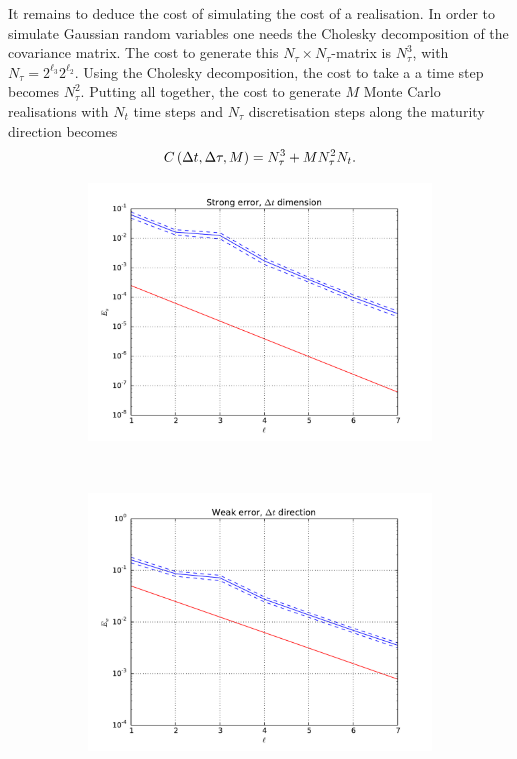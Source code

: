 \documentclass[11pt]{amsart}
\begin{document}
It remains to deduce the cost of simulating the cost of a realisation. In order to
simulate Gaussian random variables one needs the Cholesky decomposition of the covariance matrix. The cost to generate this $N_\tau \times N_\tau$-matrix is $N_\tau^3$, with $N_\tau = 2^{\ell_3} 2^{\ell_2}$. Using the Cholesky decomposition, the cost to take a a time step becomes $N_\tau^2$. Putting all together, the cost to generate $M$ Monte Carlo realisations with $N_t$ time steps and $N_\tau$ discretisation steps along the maturity direction becomes
\begin{align*}
C \left( {\Delta t, \Delta \tau, M} \right) = N_\tau^3 + M N_\tau^2 N_t.
\end{align*}

\begin{figure}
    \centering
    \begin{subfigure}[b]{0.4\textwidth}
        \includegraphics[width=\textwidth]{dim_1_strong.pdf}
        \label{fig:gull}
    \end{subfigure}
    ~ %
    \begin{subfigure}[b]{0.4\textwidth}
        \includegraphics[width=\textwidth]{dim_1_weak.pdf}

\end{subfigure}
\end{figure}
\end{document}
